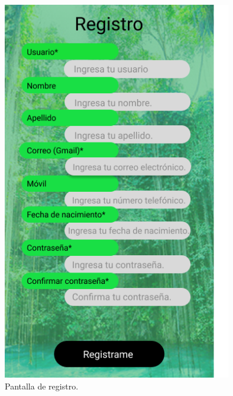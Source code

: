 \begin{figure}[htb]
    \centering
    \includegraphics[width=10cm]{pantalla2.png}
    \caption{Pantalla de registro.}
    \label{fig:enter-label}
\end{figure}

